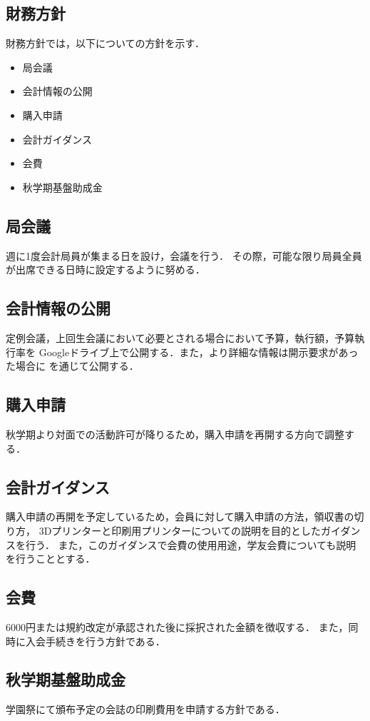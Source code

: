 \subsection*{財務方針}


財務方針では，以下についての方針を示す．
\begin{itemize}
  \item 局会議
  \item 会計情報の公開
  \item 購入申請
  \item 会計ガイダンス
  \item 会費
  \item 秋学期基盤助成金
\end{itemize}

\subsection*{局会議}
週に1度会計局員が集まる日を設け，会議を行う．
その際，可能な限り局員全員が出席できる日時に設定するように努める．

\subsection*{会計情報の公開}
定例会議，上回生会議において必要とされる場合において予算，執行額，予算執行率を
Googleドライブ上で公開する．また，より詳細な情報は開示要求があった場合に\kaikeiStaff{}
を通じて公開する．

\subsection*{購入申請}
秋学期より対面での活動許可が降りるため，購入申請を再開する方向で調整する．

\subsection*{会計ガイダンス}
購入申請の再開を予定しているため，会員に対して購入申請の方法，領収書の切り方，
3Dプリンターと印刷用プリンターについての説明を目的としたガイダンスを行う．
また，このガイダンスで会費の使用用途，学友会費についても説明を行うこととする．

\subsection*{会費}
6000円または規約改定が承認された後に採択された金額を徴収する．
また，同時に入会手続きを行う方針である．

\subsection*{秋学期基盤助成金}
学園祭にて頒布予定の会誌の印刷費用を申請する方針である．
